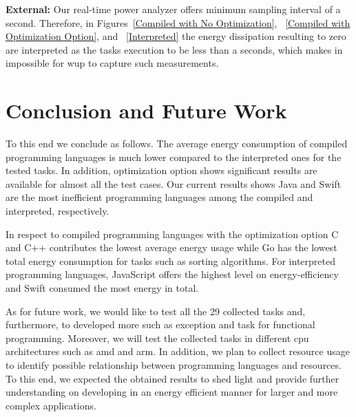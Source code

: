 \noindent\textbf{External:} Our real-time power analyzer offers minimum sampling 
interval of a second. 
Therefore, in Figures~\ref{Compiled with No Optimization}, 
~\ref{Compiled with Optimization Option}, and ~\ref{Interpreted} 
the energy dissipation resulting to zero are interpreted 
as the tasks execution to be less than a seconds, which makes in 
impossible for {\sc wup} to capture such measurements.

\section{Conclusion and Future Work} \label{conclusiona_and_future_work}
To this end we conclude as follows. 
The average energy consumption of compiled programming languages is 
much lower compared to the interpreted ones for the tested tasks. 
In addition, optimization option shows significant results are 
available for almost all the test cases. 
Our current results shows Java and Swift are the most inefficient 
programming languages among the compiled and interpreted, 
respectively.

In respect to compiled programming languages with the optimization 
option C and C++ contributes the lowest average energy usage while 
Go has the lowest total energy consumption for tasks such as sorting 
algorithms. 
For interpreted programming languages, JavaScript offers 
the highest level on energy-efficiency and Swift consumed the most 
energy in total.

As for future work, we would like to test all the 29 collected 
tasks and, furthermore, to developed more such as exception 
and task for functional programming. 
Moreover, we will test the collected tasks in different {\sc cpu} 
architectures such as {\sc amd} and {\sc arm}. 
In addition, we plan to collect resource usage to identify 
possible relationship between programming  languages and 
resources. 
To this end, we expected the obtained results to shed light 
and provide further understanding on developing in an energy 
efficient manner for larger and  more complex applications.



